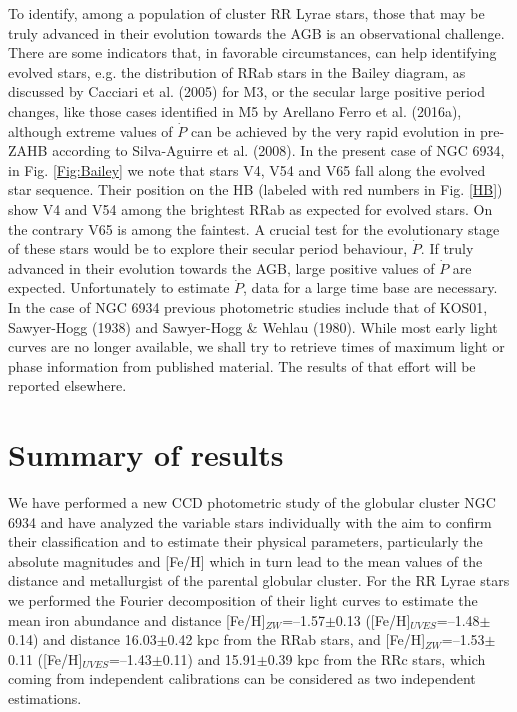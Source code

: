 \documentclass[journal]{rmaa}
\newcommand{\1}{\'{\i}}
\begin{document}
To identify, among a population of cluster RR Lyrae stars, those that may be truly
advanced in their evolution towards the AGB is an observational challenge. There are
some indicators that, in favorable circumstances, can help identifying evolved stars,
e.g. the distribution of RRab stars in the Bailey diagram, as discussed by Cacciari
et al. (2005) for M3, or the secular large positive period changes, like those cases
identified in M5 by Arellano Ferro et al. (2016a), although extreme values of $\dot P$
can be achieved by the very rapid evolution in pre-ZAHB according to Silva-Aguirre et
al. (2008). In the present case of NGC 6934, in
Fig. \ref{Fig:Bailey} we note that stars V4, V54 and V65 fall along the evolved star
sequence. Their position on the HB (labeled with
red numbers in Fig. \ref{HB}) show V4 and V54 among the brightest RRab as expected for
evolved stars. On the contrary V65 is among the faintest. A crucial test for the
evolutionary stage of these stars would be to explore their secular period behaviour,
$\dot P$.
If truly advanced in their evolution towards the AGB, large positive values of $\dot
P$ are expected. Unfortunately to estimate $\dot P$, data for a large time base are
necessary. In the case of NGC 6934 previous photometric studies include that of KOS01,
Sawyer-Hogg (1938) and Sawyer-Hogg \& Wehlau (1980). While most early light curves
are no longer available, we shall try to retrieve times of maximum light or phase
information from published material. The results of that effort will be reported
elsewhere.


\section{Summary of results}
\label{sec:Summ}

We have performed a new CCD photometric study of the globular cluster NGC 6934 and
have analyzed the variable stars individually with the aim to
confirm their classification and to estimate their physical parameters, particularly
the absolute magnitudes and [Fe/H] which in turn lead to the mean values of the
distance and metallurgist of the parental globular cluster. For the RR
Lyrae stars we
performed the Fourier decomposition of their light curves to estimate the mean iron
abundance and distance [Fe/H]$_{ZW}$=--1.57$\pm$0.13
([Fe/H]$_{UVES}$=--1.48$\pm$0.14) and distance 16.03$\pm$0.42 kpc
from the RRab stars, and [Fe/H]$_{ZW}$=--1.53$\pm$0.11
([Fe/H]$_{UVES}$=--1.43$\pm$0.11) and 15.91$\pm$0.39 kpc from the RRc stars, which
coming from independent calibrations can be considered as two independent estimations.
\end{document}
